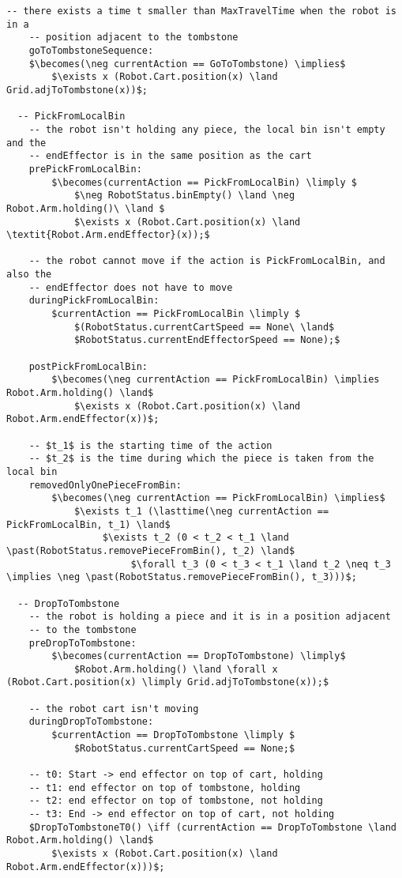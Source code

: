 \begin{lstlisting}[fontadjust, mathescape, frame=single]
    -- there exists a time t smaller than MaxTravelTime when the robot is in a 
    -- position adjacent to the tombstone
    goToTombstoneSequence:
    $\becomes(\neg currentAction == GoToTombstone) \implies$
        $\exists x (Robot.Cart.position(x) \land Grid.adjToTombstone(x))$;

  -- PickFromLocalBin
    -- the robot isn't holding any piece, the local bin isn't empty and the 
    -- endEffector is in the same position as the cart
    prePickFromLocalBin:
        $\becomes(currentAction == PickFromLocalBin) \limply $
            $\neg RobotStatus.binEmpty() \land \neg Robot.Arm.holding()\ \land $
            $\exists x (Robot.Cart.position(x) \land \textit{Robot.Arm.endEffector}(x));$
    
    -- the robot cannot move if the action is PickFromLocalBin, and also the 
    -- endEffector does not have to move
    duringPickFromLocalBin:
        $currentAction == PickFromLocalBin \limply $
            $(RobotStatus.currentCartSpeed == None\ \land$
            $RobotStatus.currentEndEffectorSpeed == None);$
  
    postPickFromLocalBin:
        $\becomes(\neg currentAction == PickFromLocalBin) \implies Robot.Arm.holding() \land$
            $\exists x (Robot.Cart.position(x) \land Robot.Arm.endEffector(x))$;
            
    -- $t_1$ is the starting time of the action
    -- $t_2$ is the time during which the piece is taken from the local bin
    removedOnlyOnePieceFromBin:
        $\becomes(\neg currentAction == PickFromLocalBin) \implies$
            $\exists t_1 (\lasttime(\neg currentAction == PickFromLocalBin, t_1) \land$
                 $\exists t_2 (0 < t_2 < t_1 \land \past(RobotStatus.removePieceFromBin(), t_2) \land$
                      $\forall t_3 (0 < t_3 < t_1 \land t_2 \neq t_3 \implies \neg \past(RobotStatus.removePieceFromBin(), t_3)))$;
                      
  -- DropToTombstone
    -- the robot is holding a piece and it is in a position adjacent 
    -- to the tombstone
    preDropToTombstone:
        $\becomes(currentAction == DropToTombstone) \limply$
            $Robot.Arm.holding() \land \forall x (Robot.Cart.position(x) \limply Grid.adjToTombstone(x));$

    -- the robot cart isn't moving
    duringDropToTombstone:
        $currentAction == DropToTombstone \limply $
            $RobotStatus.currentCartSpeed == None;$

    -- t0: Start -> end effector on top of cart, holding
    -- t1: end effector on top of tombstone, holding
    -- t2: end effector on top of tombstone, not holding
    -- t3: End -> end effector on top of cart, not holding
    $DropToTombstoneT0() \iff (currentAction == DropToTombstone \land Robot.Arm.holding() \land$
        $\exists x (Robot.Cart.position(x) \land Robot.Arm.endEffector(x)))$;
    

\end{lstlisting}
